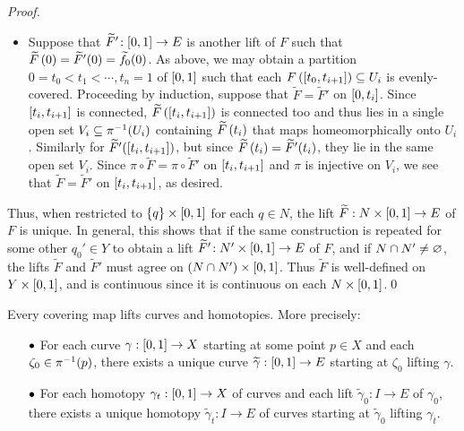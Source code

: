 \documentclass[../Moduli_Spaces_of_Riemann_Surfaces.tex]{subfiles}
\begin{document}
\begin{proof}
\begin{itemize}
            \item Suppose that $\widetilde{F}'\!:\l[0,1\r]\to E$ is another lift of $F$ such that $\widetilde{F}\l(0\r)=\widetilde{F}'\!\l(0\r)=\widetilde{f}_0\!\l(0\r)$. As above, we may obtain a partition $0=t_0<t_1<\cdots,t_n=1$ of $\l[0,1\r]$ such that each $F\l(\l[t_0,t_{i+1}\r]\r)\subseteq U_i$ is evenly-covered. Proceeding by induction, suppose that $\widetilde{F}=\widetilde{F}'$ on $\l[0,t_i\r]$. Since $\l[t_i,t_{i+1}\r]$ is connected, $\widetilde{F}\l(\l[t_i,t_{i+1}\r]\r)$ is connected too and thus lies in a single open set $V_i\subseteq\pi^{-1}\!\l(U_i\r)$ containing $\widetilde{F}\l(t_i\r)$ that maps homeomorphically onto $U_i$. Similarly for $\widetilde{F}'\!\l(\l[t_i,t_{i+1}\r]\r)$, but since $\widetilde{F}\l(t_i\r)=\widetilde{F}'\!\l(t_i\r)$, they lie in the same open set $V_i$. Since $\pi\circ\widetilde{F}=\pi\circ\widetilde{F}'$ on $\l[t_i,t_{i+1}\r]$ and $\pi$ is injective on $V_i$, we see that $\widetilde{F}=\widetilde{F}'$ on $\l[t_i,t_{i+1}\r]$, as desired.
        \end{itemize}
        Thus, when restricted to $\l\{q\r\}\times\l[0,1\r]$ for each $q\in N$, the lift $\widetilde{F}:N\times\l[0,1\r]\to E$ of $F$ is unique. In general, this shows that if the same construction is repeated for some other $q_0'\in Y$ to obtain a lift $\widetilde{F}'\!:N'\times\l[0,1\r]\to E$ of $F$, and if $N\cap N'\neq\em$, the lifts $\widetilde{F}$ and $\widetilde{F}'$ must agree on $\l(N\cap N'\r)\times\l[0,1\r]$. Thus $\widetilde{F}$ is well-defined on $Y\times\l[0,1\r]$, and is continuous since it is continuous on each $N\times\l[0,1\r]$.\qed
    \end{proof}
    \begin{corollary}
        Every covering map lifts curves and homotopies. More precisely:
        \begin{itemize}
            \item[$\blob$] For each curve $\gamma:\l[0,1\r]\to X$ starting at some point $p\in X$ and each $\zeta_0\in\pi^{-1}\!\l(p\r)$, there exists a unique curve $\widetilde{\gamma}:\l[0,1\r]\to E$ starting at $\zeta_0$ lifting $\gamma$.
                \vspace{-0.05in}
            \item[$\blob$] For each homotopy $\gamma_t:\l[0,1\r]\to X$ of curves and each lift $\widetilde{\gamma}_0:I\to E$ of $\gamma_0$, there exists a unique homotopy $\widetilde{\gamma}_t:I\to E$ of curves starting at $\widetilde{\gamma}_0$ lifting $\gamma_t$.
        \end{itemize}
    \end{corollary}
\end{document}
